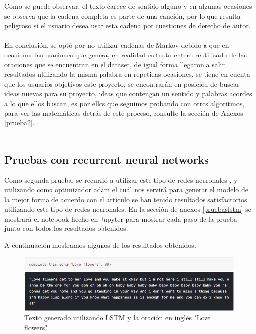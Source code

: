 \documentclass[12pt, a4paper, titlepage]{report}
\begin{document}
   		Como se puede observar, el texto carece de sentido alguno y en algunas ocasiones se observa que la cadena completa es parte de una canción, por lo que resulta peligroso si el usuario desea usar esta cadena por cuestiones de derecho de autor.\\\\
	   	En conclusión, se optó por no utilizar cadenas de Markov debido a que en ocasiones las oraciones que genera, en realidad es texto entero reutilizado de las oraciones que se encuentran en el dataset, de igual forma llegaron a salir resultados utilizando la misma palabra en repetidas ocasiones, se tiene en cuenta que los usuarios objetivos este proyecto, se encontrarán en posición de buscar ideas nuevas para su proyecto, ideas que contengan un sentido y palabras acordes a lo que ellos buscan, es por ellos que seguimos probando con otros algoritmos, para ver las matemáticas detrás de este proceso, consulte la sección de Anexos \ref{prueba2}.\\\\
	   	
	   	\subsection{Pruebas con recurrent neural networks}
	   	Como segunda prueba, se recurrió a utilizar este tipo de redes neuronales \cite{PruebaLSTM}, y utilizando como optimizador adam\cite{adam} el cuál nos servirá para generar el modelo de la mejor forma de acuerdo con el artículo \cite{adam2}se han tenido resultados satisfactorios utilizando este tipo de redes neuronales. En la sección de anexos \ref{pruebaslstm} se mostrará el notebook hecho en Jupyter para mostrar cada paso de la prueba junto con todos los resultados obtenidos.
	   	
	   	A continuación mostramos algunos de los resultados obtenidos:
	   	\begin{figure}[H]
	   		\includegraphics[width=13cm]{./imagenes/Analisis/Lstm1.png}
	   		\centering 
	   		\caption{Texto generado utilizando LSTM y la oración en inglés "Love flowers"}
	   	\end{figure}
   	
\end{document}
